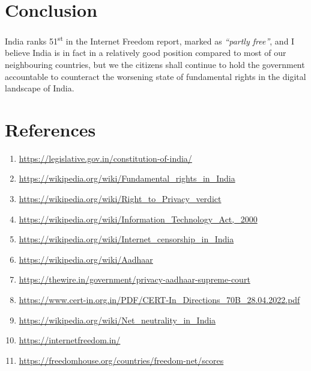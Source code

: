 \documentclass[11pt,a4paper,oneside]{scrarticle}
\begin{document}


    \section*{Conclusion}\label{sec:conclusion}
    India ranks 51\textsuperscript{st} in the Internet Freedom report, marked as \textit{``partly free''}, and I believe
    India is in fact in a relatively good position compared to most of our neighbouring countries, but we the citizens
    shall continue to hold the government accountable to counteract the worsening state of fundamental rights in the
    digital landscape of India.




    \newpage
    \section*{References}\label{sec:references}

    \begin{enumerate}
        \singlespacing
        \item \url{https://legislative.gov.in/constitution-of-india/}
        \item \url{https://wikipedia.org/wiki/Fundamental_rights_in_India}
        \item \url{https://wikipedia.org/wiki/Right_to_Privacy_verdict}
        \item \url{https://wikipedia.org/wiki/Information_Technology_Act,_2000}
        \item \url{https://wikipedia.org/wiki/Internet_censorship_in_India}
        \item \url{https://wikipedia.org/wiki/Aadhaar}
        \item \url{https://thewire.in/government/privacy-aadhaar-supreme-court}
        \item \url{https://www.cert-in.org.in/PDF/CERT-In_Directions_70B_28.04.2022.pdf}
        \item \url{https://wikipedia.org/wiki/Net_neutrality_in_India}
        \item \url{https://internetfreedom.in/}
        \item \url{https://freedomhouse.org/countries/freedom-net/scores}
    \end{enumerate}
\end{document}

